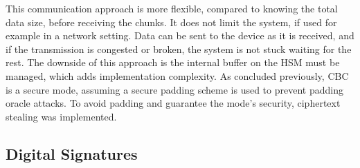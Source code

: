 This communication approach is more flexible, compared to knowing the total data size, before receiving the chunks. It does not limit the system, if used for example in a network setting. Data can be sent to the device as it is received, and if the transmission is congested or broken, the system is not stuck waiting for the rest. The downside of this approach is the internal buffer on the HSM must be managed, which adds implementation complexity.
As concluded previously, CBC is a secure mode, assuming a secure padding scheme is used to prevent padding oracle attacks. To avoid padding and guarantee the mode's security, ciphertext stealing was implemented.






\subsection{Digital Signatures}\label{chap:implementation:services:signatures}

